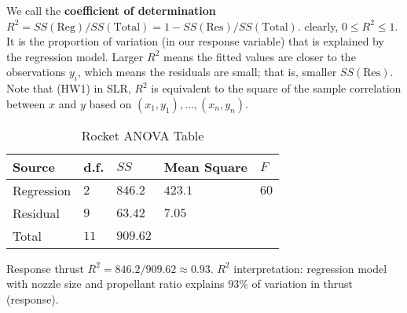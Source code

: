 We call the \textbf{coefficient of determination}
$ R^2 = SS(\text{Reg})/SS(\text{Total})=1-SS(\text{Res})/SS(\text{Total}) $.
clearly, $ 0\leqslant R^2\leqslant 1 $. It is the proportion
of variation (in our response variable) that is explained
by the regression model. Larger $ R^2 $ means
the fitted values are closer to the observations $ y_i $,
which means the residuals are small; that is, smaller $ SS(\text{Res}) $.
Note that (HW1) in SLR, $ R^2 $ is equivalent to the square of
the sample correlation between $ x $ and $ y $
based on $ (x_1,y_1),\ldots,(x_n,y_n) $.

\begin{table}[H]
    \centering
    \caption{Rocket ANOVA Table}
    \begin{tabu} to 0.9\textwidth {Y[0.5]YYY[2]Y}
        \toprule
        Source     & d.f.   & $ SS $     & Mean Square & $ F $  \\
        \midrule
        Regression & $ 2 $  & $ 846.2 $  & $ 423.1 $   & $ 60 $ \\
        Residual   & $ 9 $  & $ 63.42 $  & $ 7.05 $    &        \\
        \midrule
        Total      & $ 11 $ & $ 909.62 $                        \\
        \bottomrule
    \end{tabu}
\end{table}
Response thrust
$ R^2=846.2/909.62 \approx 0.93 $. $ R^2 $
interpretation: regression model with nozzle size and propellant ratio
explains $ 93\% $ of variation in thrust (response).
